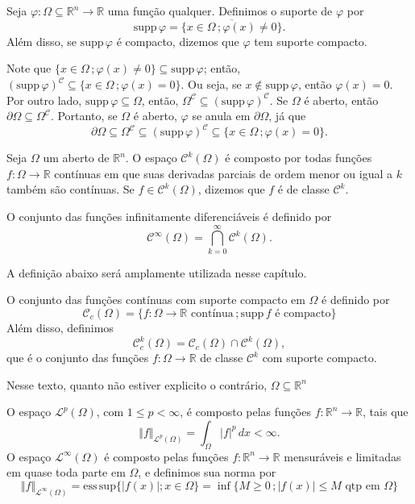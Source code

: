 \documentclass[a4paper, 11pt]{book}
\theoremstyle{definition}
\newcommand{\bR}{\mathbb{R}}
\newcommand{\cC}{\mathcal{C}}
\newcommand{\cL}{\mathcal{L}}
\newcommand{\supp}{\mathrm{supp}\,}
\begin{document}
\begin{dbox} \label{def:suporte}
    Seja $\varphi : \Omega \subseteq \bR ^n \to \bR$ uma função qualquer. Definimos o suporte de $\varphi$ por
    \[
        \supp \varphi = \overline{\{x \in \Omega \,; \varphi(x) \neq 0\}}.
    \]
    Além disso, se $\supp\varphi$ é compacto, dizemos que $\varphi$ tem suporte compacto.
\end{dbox}

Note que $\{x \in \Omega \,; \varphi(x) \neq 0\} \subseteq \supp \varphi$; então, $(\supp \varphi)^\cC \subseteq \{x \in \Omega \,; \varphi(x) = 0\}$. Ou seja, se $x \not\in \supp \varphi$, então $\varphi(x) = 0$.
Por outro lado, $\supp \varphi \subseteq \Omega$, então, $\Omega^\cC \subseteq (\supp \varphi)^\cC$.
Se $\Omega$ é aberto, então $\partial \Omega \subseteq \Omega^\cC$.
Portanto, se $\Omega$ é aberto, $\varphi$ se anula em $\partial\Omega$, já que
\[
    \partial \Omega \subseteq \Omega^\cC \subseteq (\supp \varphi)^\cC \subseteq \{x \in \Omega \,; \varphi(x) = 0\}.
\]

\begin{dbox}
    Seja $\Omega$ um aberto de $\bR^n$. O espaço $\cC^k(\Omega)$ é composto por todas funções $f : \Omega \to \bR$ contínuas em que suas derivadas parciais de ordem menor ou igual a $k$ também são contínuas.
    Se $f \in \cC^k(\Omega)$, dizemos que $f$ é de classe $\cC^k$.

    O conjunto das funções infinitamente diferenciáveis é definido por
    \[
        \cC^\infty(\Omega) = \bigcap_{k=0}^\infty \cC^k(\Omega).
    \]
\end{dbox}

A definição abaixo será amplamente utilizada nesse capítulo.

\begin{dbox}
    O conjunto das funções contínuas com suporte compacto em $\Omega$ é definido por
    \[
        \cC_c(\Omega) = \{f : \Omega \to \bR \text{ contínua} \,; \supp f \text{ é compacto}\}
    \]
    Além disso, definimos
    \[
        \cC^k_c(\Omega) = \cC_c(\Omega) \cap \cC^k(\Omega),
    \]
    que é o conjunto das funções $f : \Omega \to \bR$ de classe $\cC^k$ com suporte compacto.
\end{dbox}

Nesse texto, quanto não estiver explicito o contrário, $\Omega \subseteq \bR^n$

\begin{dbox}[Espaços $\cL^p$ e $\cL^\infty$]
    O espaço $\cL^p(\Omega)$, com $1 \leqslant p < \infty$, é composto pelas funções $f : \bR^n \to \bR$, tais que
    \[
        \Vert f \Vert_{\cL^p(\Omega)} = \int_\Omega |f|^p \, dx < \infty.
    \]
    O espaço $\cL^\infty(\Omega)$ é composto pelas funções $f : \bR^n \to \bR$ mensuráveis e limitadas em quase toda parte em $\Omega$, e definimos sua norma por
    \[
        \Vert f \Vert_{\cL^\infty(\Omega)} = \mathrm{ess\,sup} \{|f(x)|; x \in \Omega\} =\inf \{M \geqslant 0 \,; |f(x)| \leqslant M \text{ qtp em } \Omega\}
    \]
\end{dbox}
\end{document}
